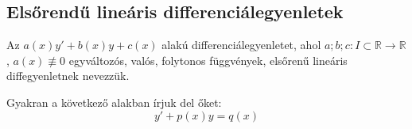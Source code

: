 \documentclass[main.tex]{subfiles}
\begin{document}
\subsection{Elsőrendű lineáris differenciálegyenletek}

Az $a(x) y' + b(x) y + c(x)$ alakú differenciálegyenletet,
ahol $a;b;c : I \subset \mathbb{R} \rightarrow \mathbb{R}$,
$a(x) \not\equiv 0$
egyváltozós, valós, folytonos függvények, elsőrenű
lineáris diffegyenletnek nevezzük.

\vspace{.33em}
Gyakran a következő alakban írjuk del őket:
\begin{equation*}
  y' + p(x)y = q(x)
\end{equation*}
\end{document}
